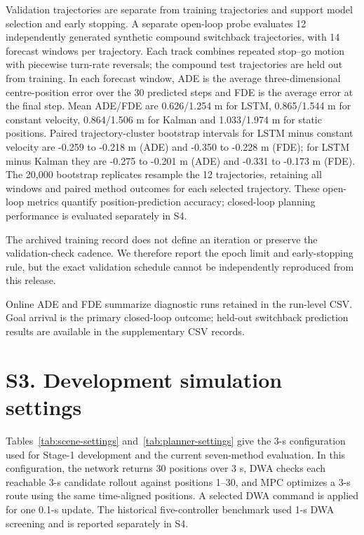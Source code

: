 \documentclass[10pt]{article}
\begin{document}
Validation trajectories are separate from training trajectories and support model selection and early stopping. A separate open-loop probe evaluates 12 independently generated synthetic compound switchback trajectories, with 14 forecast windows per trajectory. Each track combines repeated stop--go motion with piecewise turn-rate reversals; the compound test trajectories are held out from training. In each forecast window, ADE is the average three-dimensional centre-position error over the 30 predicted steps and FDE is the average error at the final step. Mean ADE/FDE are 0.626/1.254 m for LSTM, 0.865/1.544 m for constant velocity, 0.864/1.506 m for Kalman and 1.033/1.974 m for static positions. Paired trajectory-cluster bootstrap intervals for LSTM minus constant velocity are -0.259 to -0.218 m (ADE) and -0.350 to -0.228 m (FDE); for LSTM minus Kalman they are -0.275 to -0.201 m (ADE) and -0.331 to -0.173 m (FDE). The 20,000 bootstrap replicates resample the 12 trajectories, retaining all windows and paired method outcomes for each selected trajectory. These open-loop metrics quantify position-prediction accuracy; closed-loop planning performance is evaluated separately in S4.

The archived training record does not define an iteration or preserve the validation-check cadence. We therefore report the epoch limit and early-stopping rule, but the exact validation schedule cannot be independently reproduced from this release.

Online ADE and FDE summarize diagnostic runs retained in the run-level CSV. Goal arrival is the primary closed-loop outcome; held-out switchback prediction results are available in the supplementary CSV records.

\section*{S3. Development simulation settings}
Tables~\ref{tab:scene-settings} and~\ref{tab:planner-settings} give the 3-s configuration used for Stage-1 development and the current seven-method evaluation. In this configuration, the network returns 30 positions over 3 s, DWA checks each reachable 3-s candidate rollout against positions 1--30, and MPC optimizes a 3-s route using the same time-aligned positions. A selected DWA command is applied for one 0.1-s update. The historical five-controller benchmark used 1-s DWA screening and is reported separately in S4.
\end{document}
